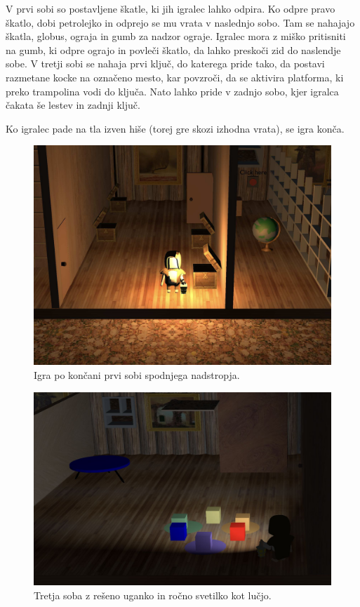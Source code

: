 \documentclass[a4paper,12pt]{article}
\begin{document}
 V prvi sobi so postavljene škatle, ki jih igralec lahko odpira. Ko odpre pravo škatlo, dobi petrolejko in odprejo se mu vrata v naslednjo sobo. Tam se nahajajo škatla, globus, ograja in gumb za nadzor ograje. Igralec mora z miško pritisniti na gumb, ki odpre ograjo in povleči škatlo, da lahko preskoči zid do naslendje sobe. V tretji sobi se nahaja prvi ključ, do katerega pride tako, da postavi razmetane kocke na označeno mesto, kar povzroči, da se aktivira platforma, ki preko trampolina vodi do ključa. Nato lahko pride v zadnjo sobo, kjer igralca čakata še lestev in zadnji ključ.
 
Ko igralec pade na tla izven hiše (torej gre skozi izhodna vrata), se igra konča.


\begin{figure}[!htb]
    \begin{center}
        \includegraphics[width=0.9\columnwidth]{prva.jpg}
        \caption{Igra po končani prvi sobi spodnjega nadstropja.}
    \end{center}
\end{figure}

\begin{figure}[!htb]
    \begin{center}
        \includegraphics[width=0.9\columnwidth]{druga.jpg}
        \caption{Tretja soba z rešeno uganko in ročno svetilko kot lučjo.}
    \end{center}
\end{figure}
\end{document}
